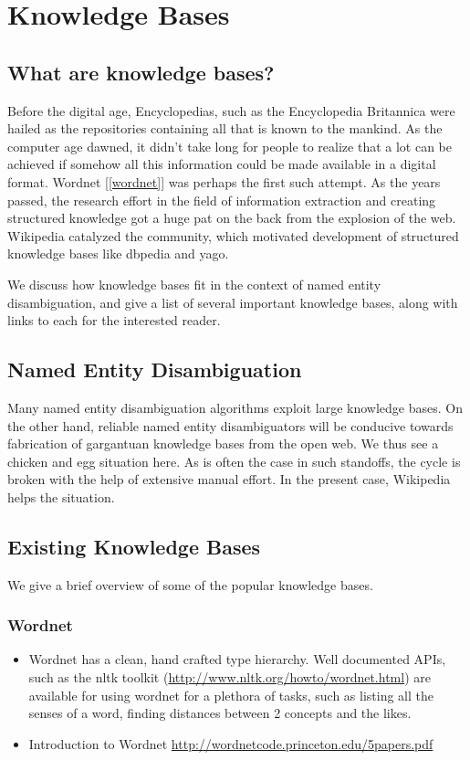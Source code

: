 \chapter{Knowledge Bases}
  
\section{What are knowledge bases?}
Before the digital age, Encyclopedias, such as the Encyclopedia Britannica were hailed as the repositories containing
all that is known to the mankind. As the computer age dawned, it didn't take long for people to realize that a lot
can be achieved if somehow all this information could be made available in a digital format.
Wordnet [\ref{wordnet}] was perhaps the first such attempt. As the years passed, the research effort in the field of information extraction and creating 
structured knowledge got a huge pat on the back from the explosion of the web. Wikipedia catalyzed the community, which motivated development 
of structured knowledge bases like dbpedia and yago.

We discuss how knowledge bases fit in the context of named entity disambiguation, and give a list of several
important knowledge bases, along with links to each for the interested reader.

\section{Named Entity Disambiguation}

Many named entity disambiguation algorithms exploit large knowledge bases.
On the other hand, reliable named entity disambiguators will be conducive towards
fabrication of gargantuan knowledge bases from the open web. We thus see 
a chicken and egg situation here. As is often the case in such standoffs, the cycle is
broken with the help of extensive manual effort. In the present case, Wikipedia helps the
situation.


\section{Existing Knowledge Bases}
We give a brief overview of some of the popular knowledge bases.
\subsection{Wordnet}
\begin{itemize}
 \item Wordnet has a clean, hand crafted type hierarchy. Well documented APIs, such as the nltk toolkit
(\url{http://www.nltk.org/howto/wordnet.html}) are available for using wordnet for a 
plethora of tasks, such as listing all the senses of a word, finding distances between 
2 concepts and the likes.
 \item Introduction to Wordnet \url{http://wordnetcode.princeton.edu/5papers.pdf}
\end{itemize}

